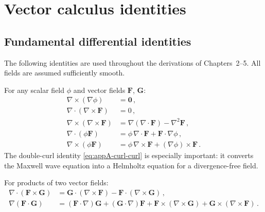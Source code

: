 
\section{Vector calculus identities}
\label{sec:appA-vector}

\subsection{Fundamental differential identities}
\label{sec:appA-differential}

The following identities are used throughout the derivations of
Chapters~2--5.  All fields are assumed sufficiently smooth.

For any scalar field $\phi$ and vector fields $\mathbf{F}$,
$\mathbf{G}$:
\begin{align}
  \nabla\times(\nabla\phi) &= \mathbf{0}\,,
    \label{eq:appA-curl-grad}\\
  \nabla\cdot(\nabla\times\mathbf{F}) &= 0\,,
    \label{eq:appA-div-curl}\\
  \nabla\times(\nabla\times\mathbf{F})
    &= \nabla(\nabla\cdot\mathbf{F})-\nabla^2\mathbf{F}\,,
    \label{eq:appA-curl-curl}\\
  \nabla\cdot(\phi\mathbf{F})
    &= \phi\,\nabla\cdot\mathbf{F}
    +\mathbf{F}\cdot\nabla\phi\,,
    \label{eq:appA-div-product}\\
  \nabla\times(\phi\mathbf{F})
    &= \phi\,\nabla\times\mathbf{F}
    +(\nabla\phi)\times\mathbf{F}\,.
    \label{eq:appA-curl-product}
\end{align}
The double-curl identity \eqref{eq:appA-curl-curl} is especially
important: it converts the Maxwell wave equation into a Helmholtz
equation for a divergence-free field.

For products of two vector fields:
\begin{align}
  \nabla\cdot(\mathbf{F}\times\mathbf{G})
    &= \mathbf{G}\cdot(\nabla\times\mathbf{F})
    -\mathbf{F}\cdot(\nabla\times\mathbf{G})\,,
    \label{eq:appA-div-cross}\\
  \nabla(\mathbf{F}\cdot\mathbf{G})
    &= (\mathbf{F}\cdot\nabla)\mathbf{G}
    +(\mathbf{G}\cdot\nabla)\mathbf{F}
    +\mathbf{F}\times(\nabla\times\mathbf{G})
    +\mathbf{G}\times(\nabla\times\mathbf{F})\,.
    \label{eq:appA-grad-dot}
\end{align}

